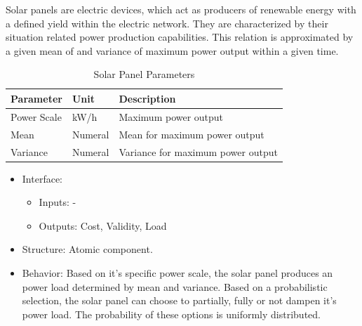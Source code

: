 Solar panels are electric devices, which act as producers of renewable energy with a defined yield within the electric network. They are characterized by their situation related power production capabilities. This relation is approximated by a given mean of and variance of maximum power output within a given time.

\begin{table}[h]
	\renewcommand{\arraystretch}{1.3}
	\caption{Solar Panel Parameters}
	\centering
	\begin{tabular}{lll}
		\hline
		\textbf{Parameter}                    & \textbf{Unit}    & \textbf{Description} \\ \hline
		Power Scale                       	  & kW/h          	 & Maximum power output \\
		Mean                       	  		  & Numeral          & Mean for maximum power output  \\
		Variance                       	      & Numeral          & Variance for maximum power output \\ \hline
	\end{tabular}
\end{table}

\begin{itemize}
	\item Interface:
	\begin{itemize}
		\item Inputs: -
		\item Outputs: Cost, Validity, Load
	\end{itemize}	
	\item Structure: Atomic component.
	\item Behavior: Based on it's specific power scale, the solar panel produces an power load determined by mean and variance. Based on a probabilistic selection, the solar panel can choose to partially, fully or not dampen it's power load. The probability of these options is uniformly distributed. 
\end{itemize}

